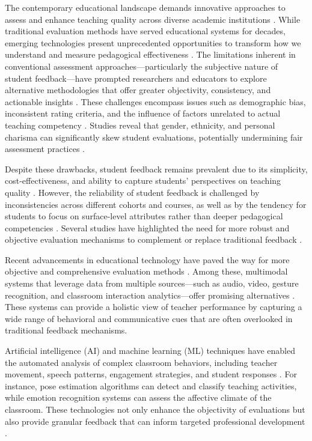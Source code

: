
The contemporary educational landscape demands innovative approaches to assess and enhance teaching quality across diverse academic institutions \cite{Heffernan2022}. While traditional evaluation methods have served educational systems for decades, emerging technologies present unprecedented opportunities to transform how we understand and measure pedagogical effectiveness \cite{Ajmal2024}. The limitations inherent in conventional assessment approaches—particularly the subjective nature of student feedback—have prompted researchers and educators to explore alternative methodologies that offer greater objectivity, consistency, and actionable insights \cite{Heffernan2022}. These challenges encompass issues such as demographic bias, inconsistent rating criteria, and the influence of factors unrelated to actual teaching competency \cite{Steinberg2021}. Studies reveal that gender, ethnicity, and personal charisma can significantly skew student evaluations, potentially undermining fair assessment practices \cite{Steinberg2021}.

Despite these drawbacks, student feedback remains prevalent due to its simplicity, cost-effectiveness, and ability to capture students' perspectives on teaching quality \cite{Ajmal2024}. However, the reliability of student feedback is challenged by inconsistencies across different cohorts and courses, as well as by the tendency for students to focus on surface-level attributes rather than deeper pedagogical competencies \cite{carvalho2022biases}. Several studies have highlighted the need for more robust and objective evaluation mechanisms to complement or replace traditional feedback \cite{Ginsburg2022NecessaryBI}.

Recent advancements in educational technology have paved the way for more objective and comprehensive evaluation methods \cite{Wang2022}. Among these, multimodal systems that leverage data from multiple sources—such as audio, video, gesture recognition, and classroom interaction analytics—offer promising alternatives \cite{10.1007/978-981-99-9109-9_7}. These systems can provide a holistic view of teacher performance by capturing a wide range of behavioral and communicative cues that are often overlooked in traditional feedback mechanisms.

Artificial intelligence (AI) and machine learning (ML) techniques have enabled the automated analysis of complex classroom behaviors, including teacher movement, speech patterns, engagement strategies, and student responses \cite{Wang2022}. For instance, pose estimation algorithms can detect and classify teaching activities, while emotion recognition systems can assess the affective climate of the classroom. These technologies not only enhance the objectivity of evaluations but also provide granular feedback that can inform targeted professional development \cite{YE2023108915}.


